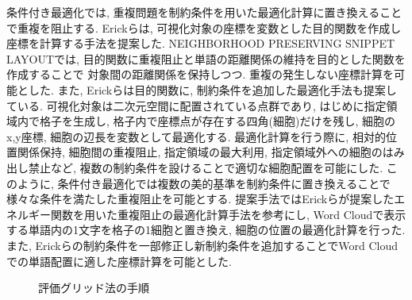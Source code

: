 \documentclass[syuuron]{kuee}
\begin{document}
		条件付き最適化では, 重複問題を制約条件を用いた最適化計算に置き換えることで重複を阻止する. 
		Erickらは, 可視化対象の座標を変数とした目的関数を作成し座標を計算する手法を提案した\cite{or1}. 
		NEIGHBORHOOD PRESERVING SNIPPET LAYOUTでは, 目的関数に重複阻止と単語の距離関係の維持を目的とした関数を作成することで
		対象間の距離関係を保持しつつ. 重複の発生しない座標計算を可能とした. 
		また, Erickらは目的関数に, 制約条件を追加した最適化手法も提案している\cite{or2}.  
		可視化対象は二次元空間に配置されている点群であり, はじめに指定領域内で格子を生成し, 格子内で座標点が存在する四角(細胞)だけを残し, 
		細胞のx,y座標, 細胞の辺長を変数として最適化する. 
		最適化計算を行う際に, 相対的位置関係保持, 細胞間の重複阻止, 指定領域の最大利用, 指定領域外への細胞のはみ出し禁止など, 
		複数の制約条件を設けることで適切な細胞配置を可能にした. 
		このように, 条件付き最適化では複数の美的基準を制約条件に置き換えることで様々な条件を満たした重複阻止を可能とする. 
		提案手法ではErickらが提案したエネルギー関数を用いた重複阻止の最適化計算手法を参考にし, 
		Word Cloudで表示する単語内の1文字を格子の1細胞と置き換え, 細胞の位置の最適化計算を行った. 
		また, Erickらの制約条件を一部修正し新制約条件を追加することでWord Cloudでの単語配置に適した座標計算を可能とした. 
		
		\begin{figure}
			\begin{center}
			\end{center}
			\caption{評価グリッド法の手順\cite{egm6}}
	  		\label{fig:egm1}
		\end{figure}
\end{document}
